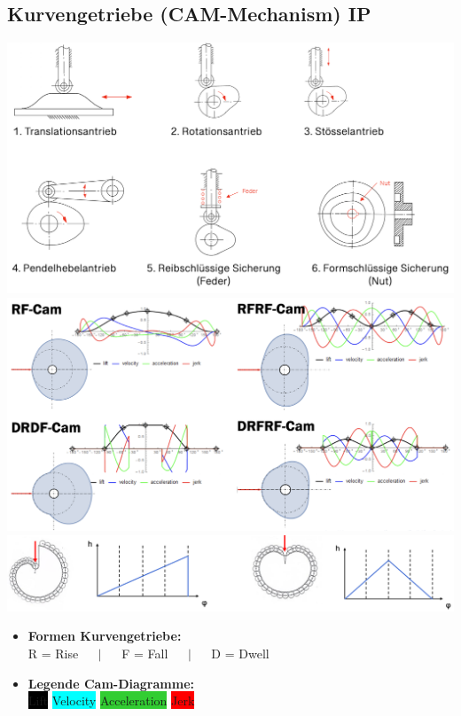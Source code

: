 \subsection{Kurvengetriebe (CAM-Mechanism) \hfill IP}
\begin{footnotesize}
    \begin{center}
        \includegraphics[width = 0.8\linewidth]{MAEIP_Kurvengetriebe}
        \includegraphics[width = 0.75\linewidth]{MAEIP_VariationKurvenform}
        \includegraphics[width = 0.8\linewidth]{MAEIP_ArchimedesKurvenform}
    \end{center}
    \begin{itemize}
        \item \textbf{Formen Kurvengetriebe:} 
        \\ R = Rise $\quad \mid \quad$ F = Fall $\quad \mid \quad$ D = Dwell
        \item \textbf{Legende Cam-Diagramme:}
        \\ \colorbox{Black}{\color{white} Lift} \colorbox{Cyan}{Velocity} \colorbox{LimeGreen}{Acceleration} \colorbox{Red}{Jerk}
    \end{itemize}
\end{footnotesize}